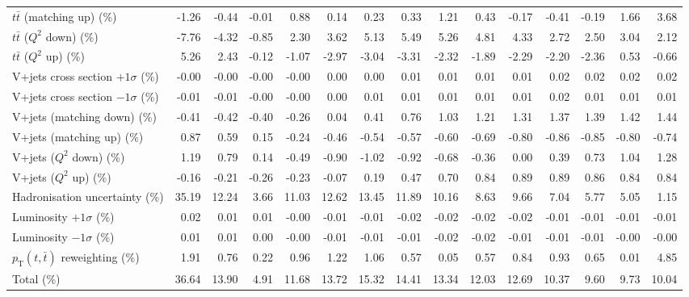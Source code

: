 \begin{table}[htbp]
{\begin{tabular}{lrrrrrrrrrrrrrr}
$t\bar{t}$ (matching up) (\%) & -1.26 & -0.44 & -0.01 & 0.88 & 0.14 & 0.23 & 0.33 & 1.21 & 0.43 & -0.17 & -0.41 & -0.19 & 1.66 & 3.68 \\ 
$t\bar{t}$ ($Q^{2}$ down) (\%) & -7.76 & -4.32 & -0.85 & 2.30 & 3.62 & 5.13 & 5.49 & 5.26 & 4.81 & 4.33 & 2.72 & 2.50 & 3.04 & 2.12 \\ 
$t\bar{t}$ ($Q^{2}$ up) (\%) & 5.26 & 2.43 & -0.12 & -1.07 & -2.97 & -3.04 & -3.31 & -2.32 & -1.89 & -2.29 & -2.20 & -2.36 & 0.53 & -0.66 \\ 
V+jets cross section \ensuremath{+1\sigma} (\%) & -0.00 & -0.00 & -0.00 & -0.00 & 0.00 & 0.00 & 0.01 & 0.01 & 0.01 & 0.01 & 0.02 & 0.02 & 0.02 & 0.02 \\ 
V+jets cross section \ensuremath{-1\sigma} (\%) & -0.01 & -0.01 & -0.00 & -0.00 & 0.00 & 0.01 & 0.01 & 0.01 & 0.01 & 0.01 & 0.02 & 0.01 & 0.01 & 0.01 \\ 
V+jets (matching down) (\%) & -0.41 & -0.42 & -0.40 & -0.26 & 0.04 & 0.41 & 0.76 & 1.03 & 1.21 & 1.31 & 1.37 & 1.39 & 1.42 & 1.44 \\ 
V+jets (matching up) (\%) & 0.87 & 0.59 & 0.15 & -0.24 & -0.46 & -0.54 & -0.57 & -0.60 & -0.69 & -0.80 & -0.86 & -0.85 & -0.80 & -0.74 \\ 
V+jets ($Q^{2}$ down) (\%) & 1.19 & 0.79 & 0.14 & -0.49 & -0.90 & -1.02 & -0.92 & -0.68 & -0.36 & 0.00 & 0.39 & 0.73 & 1.04 & 1.28 \\ 
V+jets ($Q^{2}$ up) (\%) & -0.16 & -0.21 & -0.26 & -0.23 & -0.07 & 0.19 & 0.47 & 0.70 & 0.84 & 0.89 & 0.89 & 0.86 & 0.84 & 0.84 \\ 
Hadronisation uncertainty (\%) & 35.19 & 12.24 & 3.66 & 11.03 & 12.62 & 13.45 & 11.89 & 10.16 & 8.63 & 9.66 & 7.04 & 5.77 & 5.05 & 1.15 \\ 
Luminosity $+1\sigma$ (\%) & 0.02 & 0.01 & 0.01 & -0.00 & -0.01 & -0.01 & -0.02 & -0.02 & -0.02 & -0.02 & -0.01 & -0.01 & -0.01 & -0.01 \\ 
Luminosity $-1\sigma$ (\%) & 0.01 & 0.01 & 0.00 & -0.00 & -0.01 & -0.01 & -0.01 & -0.02 & -0.02 & -0.01 & -0.01 & -0.01 & -0.00 & -0.00 \\ 
$p_\mathrm{T}(t,\bar{t})$ reweighting (\%) & 1.91 & 0.76 & 0.22 & 0.96 & 1.22 & 1.06 & 0.57 & 0.05 & 0.57 & 0.84 & 0.93 & 0.65 & 0.01 & 4.85 \\ 
\hline 
Total (\%) & 36.64  & 13.90  & 4.91  & 11.68  & 13.72  & 15.32  & 14.41  & 13.34  & 12.03  & 12.69  & 10.37  & 9.60  & 9.73  & 10.04 \\ 
\hline 
\end{tabular}
}
\end{table}
